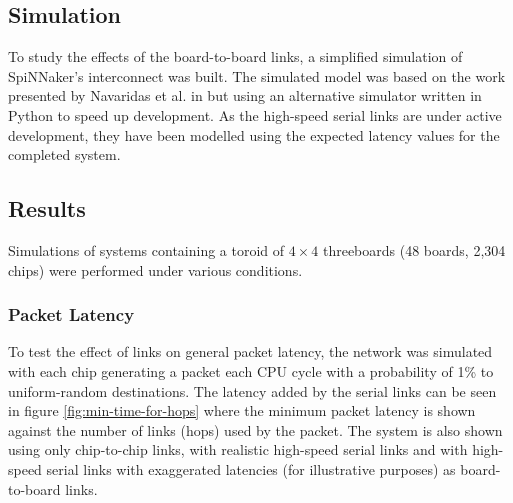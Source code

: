 		\subsection{Simulation}
			
			To study the effects of the board-to-board links, a simplified simulation
			of SpiNNaker's interconnect was built. The simulated model was based on
			the work presented by Navaridas et al. in \cite{navaridas09} but using an
			alternative simulator written in Python to speed up development. As the
			high-speed serial links are under active development, they have been
			modelled using the expected latency values for the completed system.
			
		\subsection{Results}
			
			Simulations of systems containing a toroid of $4\times4$ threeboards (48
			boards, 2,304 chips) were performed under various conditions.
			
			\subsubsection{Packet Latency}
			
				To test the effect of links on general packet latency, the network was
				simulated with each chip generating a packet each CPU cycle with a
				probability of 1\% to uniform-random destinations. The latency added by
				the serial links can be seen in figure \ref{fig:min-time-for-hops} where
				the minimum packet latency is shown against the number of links (hops)
				used by the packet. The system is also shown using only chip-to-chip
				links, with realistic high-speed serial links and with high-speed serial
				links with exaggerated latencies (for illustrative purposes) as
				board-to-board links.
				
